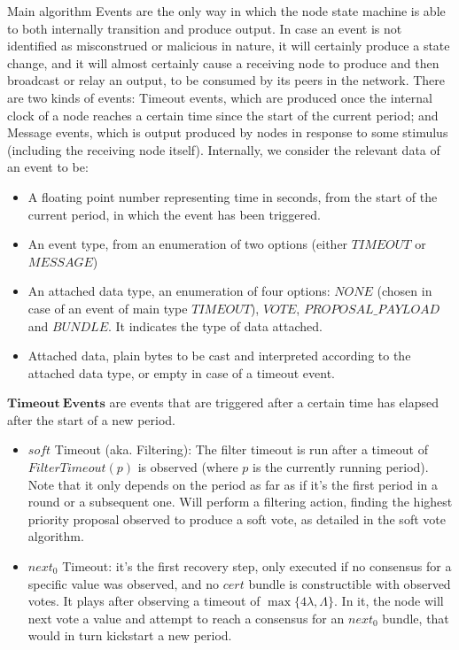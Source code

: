 \documentclass[10pt,a4paper]{article}
\begin{document}
\begin{section}{Main algorithm}
\medskip
Events are the only way in which the node state machine is able to both internally transition and produce output.
In case an event is not identified as misconstrued or malicious in nature, it will certainly produce a state change,
and it will almost certainly cause a receiving node to produce and then broadcast or relay an output, to be consumed
by its peers in the network.
There are two kinds of events: Timeout events, which are produced once the internal clock of a node reaches a certain
time since the start of the current period; and Message events, which is output produced by nodes in response to some stimulus
(including the receiving node itself).
Internally, we consider the relevant data of an event to be:
\begin{itemize}
    \item A floating point number representing time in seconds, from the start of the current period, in which the event
    has been triggered.
    \item An event type, from an enumeration of two options (either $TIMEOUT$ or $MESSAGE$)
    \item An attached data type, an enumeration of four options: $NONE$ (chosen in case of an event of main type $TIMEOUT$), 
    $VOTE$, $PROPOSAL\_PAYLOAD$ and $BUNDLE$. It indicates the type of data attached.
    \item Attached data, plain bytes to be cast and interpreted according to the attached data type, or empty in case of a
    timeout event.
\end{itemize}

$\mathbf{Timeout \ Events}$ are events that are triggered after a certain time has elapsed after the start of a new period.
\begin{itemize}
    \item $soft$ Timeout (aka. Filtering): The filter timeout is run after a timeout of $FilterTimeout(p)$ is observed 
    (where $p$ is the currently running period). Note that it only depends on the period as far as if it's the first
    period in a round or a subsequent one.
    Will perform a filtering action, finding the highest priority proposal observed to produce a soft vote, as detailed
    in the soft vote algorithm.

    \item $next_0$ Timeout: it's the first recovery step, only executed if no consensus for a specific value was observed,
    and no $cert$ bundle is constructible with observed votes. It plays after observing a timeout of $\max\{4\lambda, \Lambda \}$.
    In it, the node will next vote a value and attempt to reach a consensus for an $next_0$ bundle, that would in turn kickstart
    a new period.


\end{itemize}
\end{section}
\end{document}
